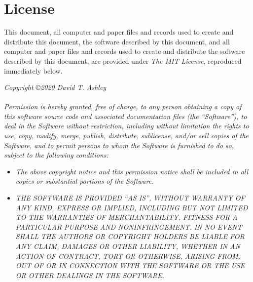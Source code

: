 \section{License}
\label{ciov2:slic0}

This document, all computer and paper files and records used to create and
distribute this document, the software described by this document, and all computer
and paper files and records used to create and distribute the software described by
this document, are provided under \emph{The MIT License},
reproduced immediately below.\\

\begin{small}
\noindent{}\emph{Copyright \copyright 2020 David T. Ashley}\\\\
\noindent{}\emph{Permission is hereby granted, free of charge, to any person obtaining a copy
of this software source code and associated documentation files (the
``Software''), to deal in the Software without restriction, including without
limitation the rights to use, copy, modify, merge, publish, distribute,
sublicense, and/or sell copies of the Software, and to permit persons to whom
the Software is furnished to do so, subject to the following conditions:}

\begin{itemize}
\item \emph{The above copyright notice and this permission notice shall be included in
      all copies or substantial portions of the Software.}
\item \emph{THE SOFTWARE IS PROVIDED ``AS IS'', WITHOUT WARRANTY OF ANY KIND, EXPRESS OR
      IMPLIED, INCLUDING BUT NOT LIMITED TO THE WARRANTIES OF MERCHANTABILITY,
      FITNESS FOR A PARTICULAR PURPOSE AND NONINFRINGEMENT\@. IN NO EVENT SHALL THE
      AUTHORS OR COPYRIGHT HOLDERS BE LIABLE FOR ANY CLAIM, DAMAGES OR OTHER
      LIABILITY, WHETHER IN AN ACTION OF CONTRACT, TORT OR OTHERWISE, ARISING FROM,
      OUT OF OR IN CONNECTION WITH THE SOFTWARE OR THE USE OR OTHER DEALINGS IN
      THE SOFTWARE.}
\end{itemize}
\end{small}


